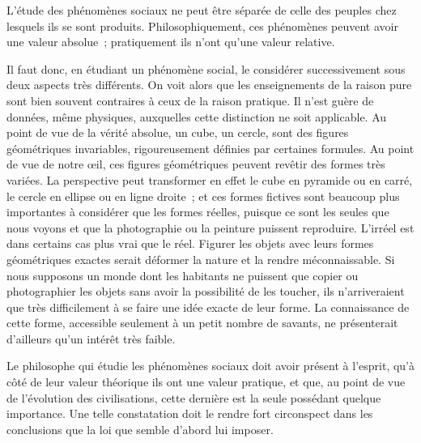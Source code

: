 \documentclass[french,twoside]{book} %
\begin{document}
L’étude des phénomènes sociaux ne peut être séparée de celle des peuples chez lesquels ils se sont produits. Philosophiquement, ces phénomènes peuvent avoir une valeur absolue ; pratiquement ils n’ont qu’une valeur relative.\par
Il faut donc, en étudiant un phénomène social, le considérer successivement sous deux aspects très différents. On voit alors que les enseignements de la raison pure sont bien souvent contraires à ceux de la raison pratique. Il n’est guère de données, même physiques, auxquelles cette distinction ne soit applicable. Au point de vue de la vérité absolue, un cube, un cercle, sont des figures géométriques invariables, rigou­reusement définies par certaines formules. Au point de vue de notre œil, ces figures géométriques peuvent revêtir des formes très variées. La perspective peut transformer en effet le cube en pyramide ou en carré, le cercle en ellipse ou en ligne droite ; et ces formes fictives sont beaucoup plus importantes à considérer que les formes réelles, puisque ce sont les seules que nous voyons et que la photographie ou la peinture puissent reproduire. L’irréel est dans certains cas plus vrai que le réel. Figurer les objets avec leurs formes géométriques exactes serait déformer la nature et la rendre méconnaissable. Si nous supposons un monde dont les habitants ne puissent que copier ou photographier les objets sans avoir la possibilité de les toucher, ils n’arrive­raient que très difficilement à se faire une idée exacte de leur forme. La connaissance de cette forme, accessible seulement à un petit nombre de savants, ne présenterait d’ailleurs qu’un intérêt très faible.\par
Le philosophe qui étudie les phénomènes sociaux doit avoir présent à l’esprit, qu’à côté de leur valeur théorique ils ont une valeur pratique, et que, au point de vue de l’évolution des civilisations, cette dernière est la seule possédant quelque importance. Une telle constatation doit le rendre fort circonspect dans les conclusions que la loi que semble d’abord lui imposer.\par
\end{document}
